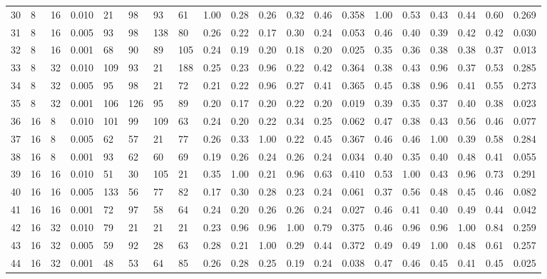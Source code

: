 \begin{landscape}
\begin{longtable}{llllllllllllllllllll}
30 & 8  & 16 & 0.010 & 21  & 98  & 93  & 61  & 1.00 & 0.28 & 0.26 & 0.32 & 0.46 & 0.358 & 1.00 & 0.53 & 0.43 & 0.44 & 0.60 & 0.269 \\
31 & 8  & 16 & 0.005 & 93  & 98  & 138 & 80  & 0.26 & 0.22 & 0.17 & 0.30 & 0.24 & 0.053 & 0.46 & 0.40 & 0.39 & 0.42 & 0.42 & 0.030 \\
32 & 8  & 16 & 0.001 & 68  & 90  & 89  & 105 & 0.24 & 0.19 & 0.20 & 0.18 & 0.20 & 0.025 & 0.35 & 0.36 & 0.38 & 0.38 & 0.37 & 0.013 \\
33 & 8  & 32 & 0.010 & 109 & 93  & 21  & 188 & 0.25 & 0.23 & 0.96 & 0.22 & 0.42 & 0.364 & 0.38 & 0.43 & 0.96 & 0.37 & 0.53 & 0.285 \\
34 & 8  & 32 & 0.005 & 95  & 98  & 21  & 72  & 0.21 & 0.22 & 0.96 & 0.27 & 0.41 & 0.365 & 0.45 & 0.38 & 0.96 & 0.41 & 0.55 & 0.273 \\
35 & 8  & 32 & 0.001 & 106 & 126 & 95  & 89  & 0.20 & 0.17 & 0.20 & 0.22 & 0.20 & 0.019 & 0.39 & 0.35 & 0.37 & 0.40 & 0.38 & 0.023 \\
36 & 16 & 8  & 0.010 & 101 & 99  & 109 & 63  & 0.24 & 0.20 & 0.22 & 0.34 & 0.25 & 0.062 & 0.47 & 0.38 & 0.43 & 0.56 & 0.46 & 0.077 \\
37 & 16 & 8  & 0.005 & 62  & 57  & 21  & 77  & 0.26 & 0.33 & 1.00 & 0.22 & 0.45 & 0.367 & 0.46 & 0.46 & 1.00 & 0.39 & 0.58 & 0.284 \\
38 & 16 & 8  & 0.001 & 93  & 62  & 60  & 69  & 0.19 & 0.26 & 0.24 & 0.26 & 0.24 & 0.034 & 0.40 & 0.35 & 0.40 & 0.48 & 0.41 & 0.055 \\
39 & 16 & 16 & 0.010 & 51  & 30  & 105 & 21  & 0.35 & 1.00 & 0.21 & 0.96 & 0.63 & 0.410 & 0.53 & 1.00 & 0.43 & 0.96 & 0.73 & 0.291 \\
40 & 16 & 16 & 0.005 & 133 & 56  & 77  & 82  & 0.17 & 0.30 & 0.28 & 0.23 & 0.24 & 0.061 & 0.37 & 0.56 & 0.48 & 0.45 & 0.46 & 0.082 \\
41 & 16 & 16 & 0.001 & 72  & 97  & 58  & 64  & 0.24 & 0.20 & 0.26 & 0.26 & 0.24 & 0.027 & 0.46 & 0.41 & 0.40 & 0.49 & 0.44 & 0.042 \\
42 & 16 & 32 & 0.010 & 79  & 21  & 21  & 21  & 0.23 & 0.96 & 0.96 & 1.00 & 0.79 & 0.375 & 0.46 & 0.96 & 0.96 & 1.00 & 0.84 & 0.259 \\
43 & 16 & 32 & 0.005 & 59  & 92  & 28  & 63  & 0.28 & 0.21 & 1.00 & 0.29 & 0.44 & 0.372 & 0.49 & 0.49 & 1.00 & 0.48 & 0.61 & 0.257 \\
44 & 16 & 32 & 0.001 & 48  & 53  & 64  & 85  & 0.26 & 0.28 & 0.25 & 0.19 & 0.24 & 0.038 & 0.47 & 0.46 & 0.45 & 0.41 & 0.45 & 0.025 \\

\end{longtable}
\end{landscape}
